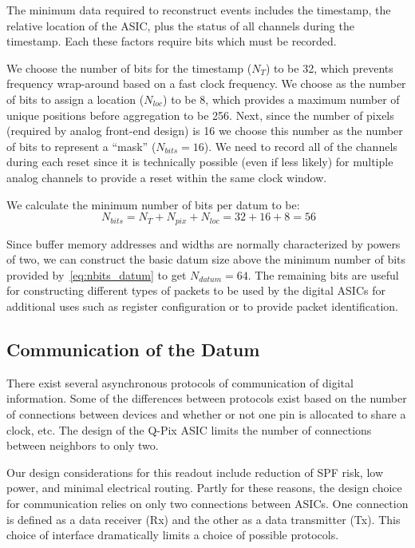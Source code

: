 The minimum data required to reconstruct events includes the timestamp, the relative location of the ASIC, plus the status of all channels during the timestamp.
Each these factors require bits which must be recorded.

We choose the number of bits for the timestamp ($N_{T}$) to be 32, which prevents frequency wrap-around based on a fast clock frequency.
We choose as the number of bits to assign a location ($N_{loc}$) to be 8, which provides a maximum number of unique positions before aggregation to be 256.
Next, since the number of pixels (required by analog front-end design) is 16 we choose this number as the number of bits to represent a ``mask'' ($N_{bits} = 16$).
We need to record all of the channels during each reset since it is technically possible (even if less likely) for multiple analog channels to provide a reset within the same clock window.

We calculate the minimum number of bits per datum to be:
\begin{equation}~\label{eq:nbits_datum}
  N_{bits} = N_{T} + N_{pix} + N_{loc} = 32 + 16 + 8 = 56
\end{equation}

Since buffer memory addresses and widths are normally characterized by powers of two, we can construct the basic datum size above the minimum number of bits provided by~\ref{eq:nbits_datum} to get $N_{datum} = 64$.
The remaining bits are useful for constructing different types of packets to be used by the digital ASICs for additional uses such as register configuration or to provide packet identification.

\subsection{Communication of the Datum}\label{sec:comms}
There exist several asynchronous protocols of communication of digital information.
Some of the differences between protocols exist based on the number of connections between devices and whether or not one pin is allocated to share a clock, etc.
The design of the Q-Pix ASIC limits the number of connections between neighbors to only two.

Our design considerations for this readout include reduction of SPF risk, low power, and minimal electrical routing.
Partly for these reasons, the design choice for communication relies on only two connections between ASICs.
One connection is defined as a data receiver (Rx) and the other as a data transmitter (Tx).
This choice of interface dramatically limits a choice of possible protocols.

